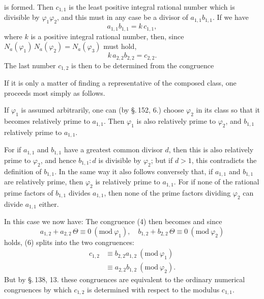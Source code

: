 
is formed. Then $c_{1,1}$ is the least positive integral rational number which is divisible by $\varphi_1 \varphi_2$, and this must in any case be a divisor of $a_{1,1} b_{1,1}$. If we have
\[
a_{1,1} b_{1,1} = k\, c_{1,1},
\]
where $k$ is a positive integral rational number, then, since $N_a(\varphi_1)\, N_a(\varphi_2) = N_a(\varphi_3)$ must hold,
\[
k\, a_{2,2} b_{2,2} = c_{2,2}.
\]
The last number $c_{1,2}$ is then to be determined from the congruence

If it is only a matter of finding a representative of the composed class, one proceeds most simply as follows.

If $\varphi_1$ is assumed arbitrarily, one can (by \S.\,152, 6.) choose $\varphi_2$ in its class so that it becomes relatively prime to $a_{1,1}$. Then $\varphi_1$ is also relatively prime to $\varphi_2$, and $b_{1,1}$ relatively prime to $a_{1,1}$.

For if $a_{1,1}$ and $b_{1,1}$ have a greatest common divisor $d$, then this is also relatively prime to $\varphi_2$, and hence $b_{1,1} : d$ is divisible by $\varphi_2$; but if $d > 1$, this contradicts the definition of $b_{1,1}$. In the same way it also follows conversely that, if $a_{1,1}$ and $b_{1,1}$ are relatively prime, then $\varphi_2$ is relatively prime to $a_{1,1}$. For if none of the rational prime factors of $b_{1,1}$ divides $a_{1,1}$, then none of the prime factors dividing $\varphi_2$ can divide $a_{1,1}$ either.

In this case we now have:
The congruence (4) then becomes
and since
\[
a_{1,2} + a_{2,2}\,\Theta \equiv 0 \ (\mathrm{mod}\ \varphi_1), \quad b_{1,2} + b_{2,2}\,\Theta \equiv 0 \ (\mathrm{mod}\ \varphi_2)
\]
holds, (6) splits into the two congruences:
\[
\begin{aligned}
c_{1,2} &\equiv b_{2,2} a_{1,2} \ (\mathrm{mod}\ \varphi_1) \\
&\equiv a_{2,2} b_{1,2} \ (\mathrm{mod}\ \varphi_2).
\end{aligned}
\]
But by \S.\,138, 13. these congruences are equivalent to the ordinary numerical congruences
by which $c_{1,2}$ is determined with respect to the modulus $c_{1,1}$.

